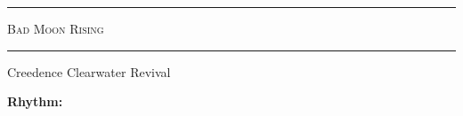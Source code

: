 \documentclass[10pt, twoside, a4paper]{article}
\begin{document}
\begin{center}

	\hrule \vspace{0.2cm}
     	\textsc{\LARGE Bad Moon Rising}
	\vspace{0.2cm} \hrule \vspace{0.2cm}
      	{\large Creedence Clearwater Revival}
      	
\end{center}


		
\textbf{Rhythm:} %
\\
\end{document}
